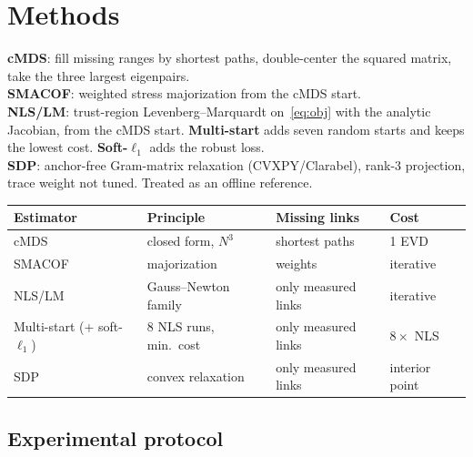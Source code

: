 \documentclass[10pt,a4paper,twocolumn]{extarticle}
\begin{document}
\section{Methods}

\textbf{cMDS}: fill missing ranges by shortest paths, double-center the squared matrix, take the three largest eigenpairs.\\
\textbf{SMACOF}: weighted stress majorization from the cMDS start. \\\textbf{NLS/LM}: trust-region Levenberg--Marquardt on~\eqref{eq:obj} with
the analytic Jacobian, from the cMDS start. \textbf{Multi-start} adds seven random starts and keeps the lowest cost. \textbf{Soft-$\ell_1$} adds the robust loss.\\
\textbf{SDP}: anchor-free Gram-matrix relaxation (CVXPY/Clarabel), rank-3 projection, trace weight not tuned. Treated as an offline reference.\\


\par\vspace{3pt}\noindent\begin{minipage}{\columnwidth}
\centering
{}
\label{tab:algos}
\footnotesize
\setlength{\tabcolsep}{3pt}
\begin{tabular}{@{}P{1.9cm}P{2.1cm}P{1.8cm}P{1.35cm}@{}}
\toprule
Estimator & Principle & Missing links & Cost\\
\midrule
cMDS & closed form, $N^3$ & shortest paths & 1 EVD\\
SMACOF & majorization & weights & iterative\\
NLS/LM & Gauss--Newton family & only measured links & iterative\\
Multi-start (+ soft-$\ell_1$) & 8 NLS runs, min.\ cost & only measured links & $8\times$ NLS\\
SDP & convex relaxation & only measured links & interior point\\
\bottomrule
\end{tabular}
\end{minipage}\par\vspace{3pt}
\subsection{Experimental protocol}
\end{document}
